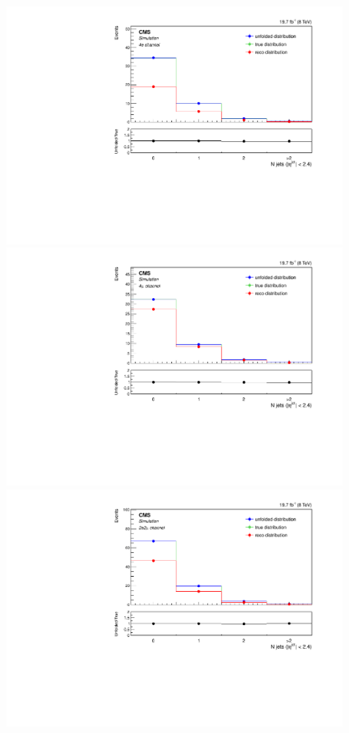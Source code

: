 \begin{figure}[hbtp]
\begin{center}
    \includegraphics[width=0.8\cmsFigWidth]{Figures/Unfolding/MCTests/CentralJets_ZZTo4e_PowMatrix_PowDistr_HalfSample_fr}     
    \includegraphics[width=0.8\cmsFigWidth]{Figures/Unfolding/MCTests/CentralJets_ZZTo4m_PowMatrix_PowDistr_HalfSample_fr}     
 \includegraphics[width=0.8\cmsFigWidth]{Figures/Unfolding/MCTests/CentralJets_ZZTo2e2m_PowMatrix_PowDistr_HalfSample_fr}        

\end{center}
\end{figure}
